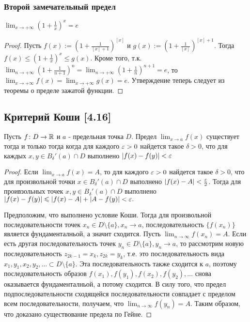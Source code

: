 \documentclass[12pt, a4paper]{article}
\begin{document}
    \subsubsection{Второй замечательный предел}
    $\lim_{x \to + \infty} \left(1 + \frac{1}{x}\right)^x = e$
    \begin{proof}
    Пусть $f(x) := \left(1 + \frac{1}{[x] + 1}\right)^{[x]}$ и $g(x) := \left(1 + \frac{1}{[x]}\right)^{[x] + 1}$. Тогда $f(x) \leq (1 + \frac{1}{x})^x \leq g(x).$ Кроме того, т.к. $\lim_{n \to + \infty} \left(1 + \frac{1}{n + 1}\right)^n = \lim_{n \to + \infty} \left(1 + \frac{1}{n}\right)^{n + 1} = e$, то $\lim_{x \to + \infty} f(x) = \lim_{x \to + \infty} g(x) = e$. Утверждение теперь следует из теоремы о пределе зажатой функции. 
    \end{proof}
    \subsection{Критерий Коши [4.16]}
    Пусть $f \colon D \to \mathbb{R}$ и $a$ - предельная точка $D$. Предел $\lim_{x \to a} f(x)$ существует тогда и только тогда когда для каждого $\varepsilon > 0$ найдется такое $\delta > 0$, что для каждых $x, y \in B_{\delta}'(a) \cap D$ выполнено $|f(x) - f(y)| < \varepsilon$
    \begin{proof}
    Если $\lim_{x \to a} f(x) = A$, то для каждого $\varepsilon > 0$ найдется такое $\delta > 0$, что для произвольной точки $x \in B_{\delta}'(a) \cap D$ выполнено $|f(x) - A| < \frac{\varepsilon}{2}$. Тогда для проивзольных точек $x, y \in B_{\delta}'(a) \cap D$ выполнено $|f(x) - f(y)| \leqslant |f(x) - A| + |A - f(y)| < \varepsilon.$

    Предположим, что выполнено условие Коши. Тогда для произвольной последовательности точек $x_n \in D \setminus \{a\}, x_n \to a$, последовательность $\{f(x_n)\}$ является фундаменталньой, а значит сходится. Пусть $\lim_{n \to \infty} f(x_n) = A$. Если есть другая последовательность точек $y_n \in D \setminus \{a\}, y_n \to a$, то рассмотрим новую последовательность $z_{2k - 1} = x_k, z_{2k} = y_k$, т.е. это последовательность вида $x_1, y_1, x_2, y_2, \dots \subset D \setminus \{a\}$. Эта последовательность также сходится к $a$, поэтому последовательность образов $f(x_1), f(y_1), f(x_2), f(y_2), \dots$ снова оказывается фундаменталньой, а потому сходится. В силу того, что предел подпоследовательности сходящейся последовательности совпадает с пределом всем последовательности, получаем, что $\lim_{n \to \infty} f(y_n) = A$. Таким образом, что доказано существование предела по Гейне.
    \end{proof}
\end{document}
